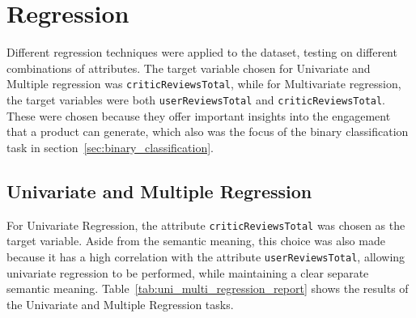 \chapter{Regression}
\label{ch:capitolo4}
Different regression techniques were applied to the dataset, testing
on different combinations of attributes. The target variable chosen for
Univariate and Multiple regression was \texttt{criticReviewsTotal}, while
for Multivariate regression, the target variables were both
\texttt{userReviewsTotal} and \texttt{criticReviewsTotal}.
These were chosen because they offer important insights into the engagement
that a product can generate, which also was the focus of the binary
classification task in section~\ref{sec:binary_classification}.


\section{Univariate and Multiple Regression}
For Univariate Regression, the attribute
\texttt{criticReviewsTotal} was chosen
as the target variable. Aside from the semantic meaning, this choice was also made
because it has a high correlation
with the attribute \texttt{userReviewsTotal}, allowing univariate regression
to be performed, while maintaining a clear separate semantic meaning.
Table~\ref{tab:uni_multi_regression_report} shows the results of the Univariate and Multiple Regression
tasks.

